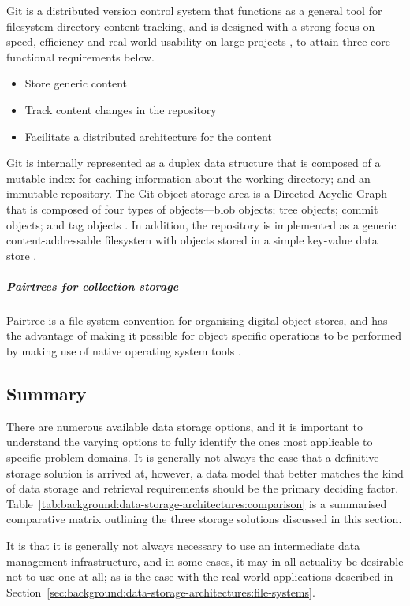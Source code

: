 Git is a distributed version control system that functions as
a general tool for filesystem directory content tracking, and is designed
with a strong focus on speed, efficiency and real-world usability on
large projects \citep[see][chap. 1]{Chacon2009}, to attain three core functional requirements below.

\begin{itemize}
 \item Store generic content
 \item Track content changes in the repository
 \item Facilitate a distributed architecture for the content
\end{itemize}

Git is internally represented as a duplex data structure that is composed of a
mutable index for caching information about the working directory; and an
immutable repository. The Git object storage area is a Directed Acyclic Graph
that is composed of four types of objects---blob objects; tree objects;
commit objects; and tag objects \citep{VirtanenGit4CS}. In addition, the repository is
implemented as a generic content-addressable filesystem with objects stored in a
simple key-value data store \citep[see][chap.9]{Chacon2009}.

\subparagraph{Pairtrees for collection storage}

Pairtree is a file system convention for organising digital object stores, and
has the advantage of making it possible for object specific operations to be
performed by making use of native operating system tools \citep{Pairtrees}.

\subsection{Summary}
\label{sec:background:file-based-storage:summary}

There are numerous available data storage options, and it is
important to understand the varying options to fully identify the ones most
applicable to specific problem domains. It is generally not always the case
that a definitive storage solution is arrived at, however, a data model that
better matches the kind of data storage and retrieval requirements should be the
primary deciding factor. Table~\ref{tab:background:data-storage-architectures:comparison} is a
summarised comparative matrix outlining the three storage solutions
discussed in this section.

It is that it is generally not always necessary to use an intermediate data management infrastructure, and in some cases, it may in all actuality be desirable not to use one at all; as is the case with the real world applications described in Section~\ref{sec:background:data-storage-architectures:file-systems}.

\tablespacing

\bodyspacing
